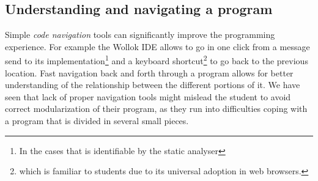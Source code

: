 %
%
%



\subsection{Understanding and navigating a program}
Simple \emph{code navigation} tools can significantly improve the programming experience.
For example the Wollok IDE allows to go in one click from a message send to its implementation\footnote{In the cases that is identifiable by the static analyser} and a keyboard shortcut\footnote{ which is familiar to students due to its universal adoption in web browsers.} to go back to the previous location.
Fast navigation back and forth through a program allows for better understanding of the relationship between the different portions of it.
We have seen that lack of proper navigation tools might mislead the student to avoid correct modularization of their program, as they run into difficulties coping with a program that is divided in several small pieces.


